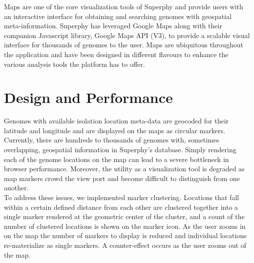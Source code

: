 \documentclass[12pt]{article}
\begin{document}
Maps are one of the core visualization tools of Superphy and provide users with an interactive interface for obtaining and searching genomes with geospatial meta-information. Superphy has leveraged Google Maps along with their companion Javascript library, Google Maps API (V3), to provide a scalable visual interface for thousands of genomes to the user. Maps are ubiquitous throughout the application and have been designed in different flavours to enhance the various analysis tools the platform has to offer.

\section{Design and Performance}

Genomes with available isolation location meta-data are geocoded for their latitude and longitude and  are displayed on the maps as circular markers. Currently, there are hundreds to thousands of genomes with, sometimes overlapping, geospatial information in Superphy's database. Simply rendering each of the genome locations on the map can lead to a severe bottleneck in browser performance. Moreover, the utility as a visualization tool is degraded as map markers crowd the view port and become difficult to distinguish from one another.\\

To address these issues, we implemented marker clustering. Locations that fall within a certain defined distance from each other are clustered together into a single marker rendered at the geometric center of the cluster, and a count of the number of clustered locations is shown on the marker icon. As the user zooms in on the map the number of markers to display is reduced and individual locations re-materialize as single markers. A counter-effect occurs as the user zooms out of the map. 

\pagebreak
\end{document}
